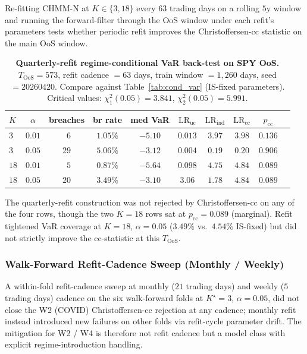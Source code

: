Re-fitting CHMM-N at $K \in \{3, 18\}$ every $63$ trading days on a rolling $5$y window and running the forward-filter through the OoS window under each refit's parameters tests whether periodic refit improves the Christoffersen-cc statistic on the main OoS window.

\begin{table}[!ht]
\centering
\small
\caption{\textbf{Quarterly-refit regime-conditional VaR back-test on SPY OoS.} $T_{\text{OoS}} = 573$, refit cadence $= 63$ days, train window $= 1{,}260$ days, seed $= 20260420$. Compare against Table~\ref{tab:cond_var} (IS-fixed parameters). Critical values: $\chi^2_1(0.05) = 3.841$, $\chi^2_2(0.05) = 5.991$.}
\label{tab:cond_var_quarterly_refit}
\begin{tabular}{l c c c c c c c c c}
\toprule
$K$ & $\alpha$ & breaches & br rate & med VaR & $\text{LR}_{\text{uc}}$ & $\text{LR}_{\text{ind}}$ & $\text{LR}_{\text{cc}}$ & $p_{\text{cc}}$ \\
\midrule
$3$  & $0.01$ & $\phantom{0}6$ & $1.05\%$ & $-5.10$ & $0.013$ & $3.97$ & $3.98$ & $0.136$ \\
$3$  & $0.05$ & $29$ & $5.06\%$ & $-3.12$ & $0.004$ & $0.19$ & $0.20$ & $0.906$ \\
$18$ & $0.01$ & $\phantom{0}5$ & $0.87\%$ & $-5.64$ & $0.098$ & $4.75$ & $4.84$ & $0.089$ \\
$18$ & $0.05$ & $20$ & $3.49\%$ & $-3.10$ & $3.06$ & $1.78$ & $4.84$ & $0.089$ \\
\bottomrule
\end{tabular}
\end{table}

The quarterly-refit construction was not rejected by Christoffersen-cc on any of the four rows, though the two $K = 18$ rows sat at $p_{\text{cc}} = 0.089$ (marginal). Refit tightened VaR coverage at $K = 18$, $\alpha = 0.05$ ($3.49\%$ vs.\ $4.54\%$ IS-fixed) but did not strictly improve the cc-statistic at this $T_{\text{OoS}}$.

\subsubsection{Walk-Forward Refit-Cadence Sweep (Monthly / Weekly)}
\label{sec:walkforward_refit_cadence}

A within-fold refit-cadence sweep at monthly ($21$ trading days) and weekly ($5$ trading days) cadence on the six walk-forward folds at $K^\star = 3$, $\alpha = 0.05$, did not close the W2 (COVID) Christoffersen-cc rejection at any cadence; monthly refit instead introduced new failures on other folds via refit-cycle parameter drift. The mitigation for W2 / W4 is therefore not refit cadence but a model class with explicit regime-introduction handling.

